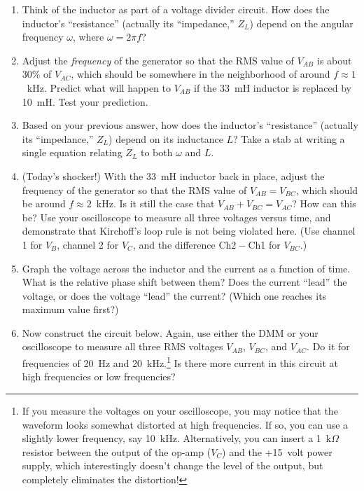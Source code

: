 \begin{enumerate}[wide]
\item Think of the inductor as part of a voltage divider circuit.  How does the inductor's ``resistance'' (actually its ``impedance,'' $Z_L$) depend on the angular frequency $\omega$, where $\omega = 2 \pi f$?

\item Adjust the \textit{frequency} of the generator so that the RMS value of $V_{AB}$ is about 30\% of $V_{AC}$, which should be somewhere in the neighborhood of around $f \approx 1$~kHz.  Predict what will happen to $V_{AB}$ if the 33~mH inductor is replaced by 10~mH.  Test your prediction.

\item Based on your previous answer, how does the inductor's ``resistance'' (actually its ``impedance,''  $Z_L$) depend on its inductance $L$?  Take a stab at writing a single equation relating $Z_L$ to both $\omega$ and $L$.

\item (Today's shocker!) With the 33~mH inductor back in place, adjust the frequency of the generator so that the RMS value of $V_{AB} = V_{BC}$, which should be around $f \approx 2$~kHz.   Is it still the case that $V_{AB} + V_{BC} = V_{AC}$?  How can this be?  Use your oscilloscope to measure all three voltages versus time, and demonstrate that Kirchoff's loop rule is not being violated here.  (Use channel 1 for $V_B$, channel 2 for $V_C$, and the difference Ch$2- $Ch1 for $V_{BC}$.)

\item Graph the voltage across the inductor and the current as a function of time.  What is the relative phase shift between them?  Does the current ``lead'' the voltage, or does the voltage ``lead'' the current? (Which one reaches its maximum value first?) \label{part_RL_graphs}

\newpage

\item Now construct the circuit below. Again, use either the DMM or your oscilloscope to measure all three RMS voltages  $V_{AB}$,  $V_{BC}$, and $V_{AC}$.   Do it for frequencies of 20~Hz and 20~kHz.\footnote{If you measure the voltages on your oscilloscope, you may notice that the waveform looks somewhat distorted at high frequencies.  If so, you can use a slightly lower frequency, say 10~kHz.  Alternatively, you can insert a 1~k$\Omega$ resistor between the output of the op-amp ($V_C$) and the +15~volt power supply, which interestingly doesn't change the level of the output, but completely eliminates the distortion!}  Is there more current in this circuit at high frequencies or low frequencies?


\end{enumerate}
